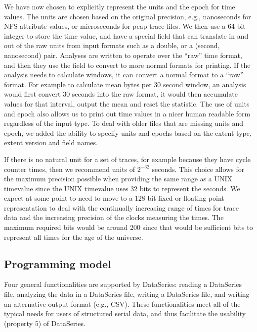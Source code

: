 \documentclass{acm_proc_article-sp}
\begin{document}
We have now chosen to explicitly represent the units and the epoch for
time values.  The units are chosen based on the original precision,
e.g., nanoseconds for NFS attribute values, or microseconds for pcap
trace files.  We then use a 64-bit integer to store the time value,
and have a special field that can translate in and out of the raw
units from input formats such as a double, or a (second, nanosecond)
pair.  Analyses are written to operate over the ``raw'' time format,
and then they use the field to convert to more normal formats for
printing.  If the analysis needs to calculate windows, it can convert
a normal format to a ``raw'' format.  For example to calculate mean
bytes per 30 second window, an analysis would first convert 30 seconds
into the raw format, it would then accumulate values for that
interval, output the mean and reset the statistic.  The use of units
and epoch also allows us to print out time values in a nicer human
readable form regardless of the input type.  To deal with older files
that are missing units and epoch, we added the ability to specify
units and epochs based on the extent type, extent version and field
names.

If there is no natural unit for a set of traces, for example because
they have cycle counter times, then we recommend units of $2^{-32}$
seconds.  This choice allows for the maximum precision possible when
providing the same range as a UNIX timevalue since the UNIX timevalue
uses 32 bits to represent the seconds.  We expect at some point to
need to move to a 128 bit fixed or floating point representation to
deal with the continually increasing range of times for trace data and
the increasing precision of the clocks measuring the times.  The
maximum required bits would be around 200 since that would be
sufficient bits to represent all times for the age of the universe.


\subsection{Programming model}

Four general functionalities are supported by DataSeries:
reading a DataSeries file, 
analyzing the data in a DataSeries file,
writing a DataSeries file,
and writing an alternative output format (e.g., CSV).
These functionalities meet all of the typical needs for
users of structured serial data, and thus facilitate
the usability (property 5) of DataSeries.
\end{document}
